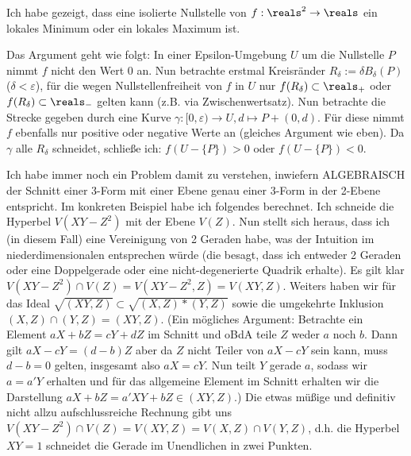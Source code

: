 
Ich habe gezeigt, dass eine isolierte Nullstelle von $f : \reals^2 \to \reals$ ein lokales Minimum oder ein lokales Maximum ist.

Das Argument geht wie folgt: In einer Epsilon-Umgebung $U$ um die Nullstelle $P$ nimmt $f$ nicht den Wert 0 an. Nun betrachte erstmal Kreisränder $R_\delta := \delta B_\delta(P)$ ($\delta < \varepsilon$), für die wegen Nullstellenfreiheit von $f$ in $U$ nur $f(R_\delta) \subset \reals_+$ oder $f(R_\delta) \subset \reals_-$ gelten kann (z.B. via Zwischenwertsatz).
Nun betrachte die Strecke gegeben durch eine Kurve $\gamma : [0,\varepsilon)  \to U, d \mapsto P + (0,d)$. Für diese nimmt $f$ ebenfalls nur positive oder negative Werte an (gleiches Argument wie eben). Da $\gamma$ alle $R_\delta$ schneidet, schließe ich: $f(U - \{ P \}) > 0$ oder $f(U- \{P \}) < 0$.

Ich habe immer noch ein Problem damit zu verstehen, inwiefern ALGEBRAISCH der Schnitt einer 3-Form mit einer Ebene genau einer 3-Form in der 2-Ebene entspricht. Im konkreten Beispiel habe ich folgendes berechnet. Ich schneide die Hyperbel $V(XY-Z^2)$ mit der Ebene $V(Z)$. Nun stellt sich heraus, dass ich (in diesem Fall) eine Vereinigung von 2 Geraden habe, was der Intuition im niederdimensionalen entsprechen würde (die besagt, dass ich entweder 2 Geraden oder eine Doppelgerade oder eine nicht-degenerierte Quadrik erhalte).
Es gilt klar $V(XY-Z^2) \cap V(Z) = V(XY-Z^2,Z) = V(XY,Z)$. Weiters haben wir für das Ideal $\sqrt{(XY,Z)} \subset \sqrt{(X,Z)*(Y,Z)}$ sowie die umgekehrte Inklusion $(X,Z)\cap (Y,Z) = (XY,Z)$. (Ein mögliches Argument: Betrachte ein Element $aX+bZ = cY+dZ$ im Schnitt und oBdA teile $Z$ weder $a$ noch $b$. Dann gilt $aX-cY = (d-b)Z$ aber da $Z$ nicht Teiler von $aX-cY$ sein kann, muss $d-b = 0$ gelten, insgesamt also $aX = cY$. Nun teilt $Y$ gerade $a$, sodass wir $a = a'Y$ erhalten und für das allgemeine Element im Schnitt erhalten wir die Darstellung $aX+bZ = a'XY+bZ \in (XY,Z)$.)
Die etwas müßige und definitiv nicht allzu aufschlussreiche Rechnung gibt uns $V(XY-Z^2) \cap V(Z) = V(XY,Z) = V(X,Z) \cap V(Y,Z)$, d.h. die Hyperbel $XY = 1$ schneidet die Gerade im Unendlichen in zwei Punkten.



